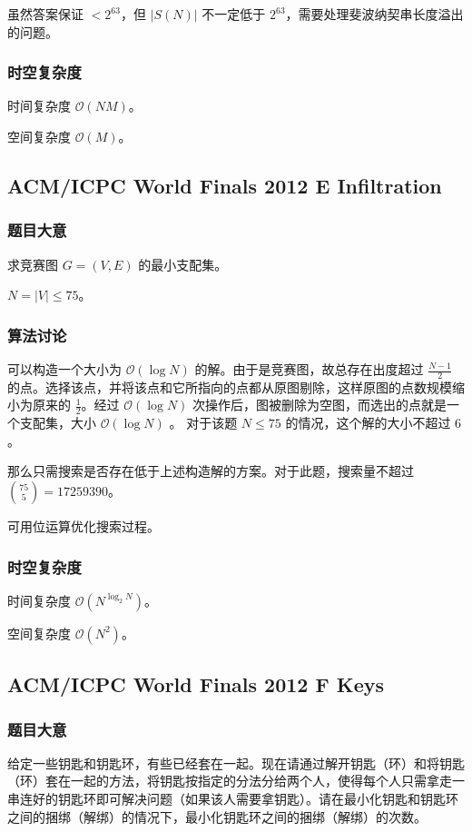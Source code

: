 				虽然答案保证  $< 2^{63}$，但 $|S(N)| $ 不一定低于 $2^{63}$，需要处理斐波纳契串长度溢出的问题。
			\subsubsection{时空复杂度}
				时间复杂度 $\mathcal{O}\left(NM\right)$。
					
				空间复杂度 $\mathcal{O}\left(M\right)$。
		\newpage

		\subsection{ACM/ICPC World Finals 2012 E Infiltration}
			\subsubsection{题目大意}
				求竞赛图 $G=(V, E)$ 的最小支配集。
			
				$N = |V| \le 75$。
			\subsubsection{算法讨论}
				可以构造一个大小为 $\mathcal{O}{\left(\log N\right)}$ 的解。由于是竞赛图，故总存在出度超过 $\frac{N-1}{2}$ 的点。选择该点，并将该点和它所指向的点都从原图剔除，这样原图的点数规模缩小为原来的 $\frac{1}{2}$。经过   $\mathcal{O}{\left(\log N\right)}$ 次操作后，图被删除为空图，而选出的点就是一个支配集，大小  $\mathcal{O}{\left(\log N\right)}$ 。 对于该题 $N \le 75$ 的情况，这个解的大小不超过 $6$。
				
				那么只需搜索是否存在低于上述构造解的方案。对于此题，搜索量不超过  $\binom{75}{5} = \num{17259390}$。
				
				可用位运算优化搜索过程。	
			
			\subsubsection{时空复杂度}
				时间复杂度 $\mathcal{O}\left( N ^{ \log_2 N}\right)$。
					
				空间复杂度 $\mathcal{O}\left(N^2\right)$。
		\newpage

		\subsection{ACM/ICPC World Finals 2012 F Keys}
			\subsubsection{题目大意}
				给定一些钥匙和钥匙环，有些已经套在一起。现在请通过解开钥匙（环）和将钥匙（环）套在一起的方法，将钥匙按指定的分法分给两个人，使得每个人只需拿走一串连好的钥匙环即可解决问题（如果该人需要拿钥匙）。请在最小化钥匙和钥匙环之间的捆绑（解绑）的情况下，最小化钥匙环之间的捆绑（解绑）的次数。
				
